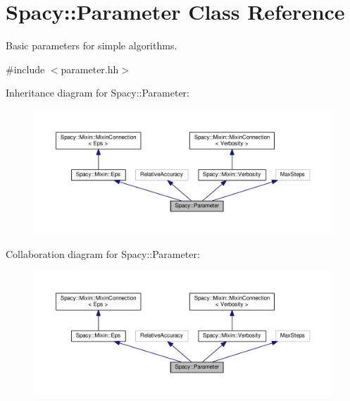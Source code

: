 \hypertarget{classSpacy_1_1Parameter}{}\section{Spacy\+:\+:Parameter Class Reference}
\label{classSpacy_1_1Parameter}


Basic parameters for simple algorithms.  




{\ttfamily \#include $<$parameter.\+hh$>$}



Inheritance diagram for Spacy\+:\+:Parameter\+:
\nopagebreak
\begin{figure}[H]
\begin{center}
\leavevmode
\includegraphics[width=350pt]{classSpacy_1_1Parameter__inherit__graph}
\end{center}
\end{figure}


Collaboration diagram for Spacy\+:\+:Parameter\+:
\nopagebreak
\begin{figure}[H]
\begin{center}
\leavevmode
\includegraphics[width=350pt]{classSpacy_1_1Parameter__coll__graph}
\end{center}
\end{figure}
